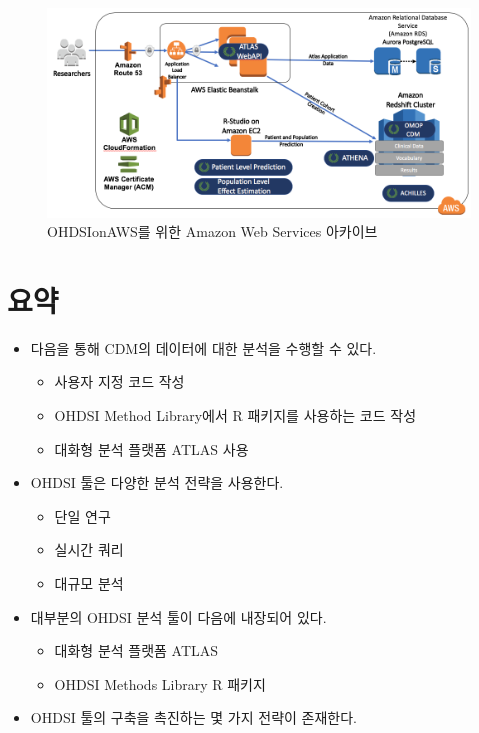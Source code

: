 \documentclass[11pt]{book}
\providecommand{\tightlist}{%
  \setlength{\itemsep}{0pt}\setlength{\parskip}{0pt}}
\theoremstyle{definition}
\theoremstyle{definition}
\theoremstyle{definition}
\theoremstyle{remark}
\let\BeginKnitrBlock\begin \let\EndKnitrBlock\end
\begin{document}
\begin{figure}

{\centering \includegraphics[width=1\linewidth]{images/OhdsiAnalyticsTools/OHDSIonAWSDiagram} 

}

\caption{OHDSIonAWS를 위한 Amazon Web Services 아카이브}\label{fig:ohdsionawsDiagram}
\end{figure}

\section{요약}\label{-6}

\BeginKnitrBlock{rmdsummary}
\begin{itemize}
\tightlist
\item
  다음을 통해 CDM의 데이터에 대한 분석을 수행할 수 있다.

  \begin{itemize}
  \tightlist
  \item
    사용자 지정 코드 작성
  \item
    OHDSI Method Library에서 R 패키지를 사용하는 코드 작성
  \item
    대화형 분석 플랫폼 ATLAS 사용
  \end{itemize}
\item
  OHDSI 툴은 다양한 분석 전략을 사용한다.

  \begin{itemize}
  \tightlist
  \item
    단일 연구
  \item
    실시간 쿼리
  \item
    대규모 분석
  \end{itemize}
\item
  대부분의 OHDSI 분석 툴이 다음에 내장되어 있다.

  \begin{itemize}
  \tightlist
  \item
    대화형 분석 플랫폼 ATLAS
  \item
    OHDSI Methods Library R 패키지
  \end{itemize}
\item
  OHDSI 툴의 구축을 촉진하는 몇 가지 전략이 존재한다.
\end{itemize}
\EndKnitrBlock{rmdsummary}
\end{document}
